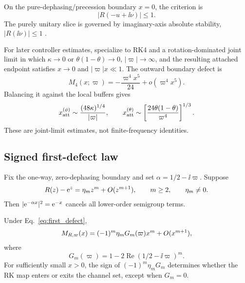 On the pure-dephasing/precession boundary $x=0$, the criterion is
\begin{equation}
 |R(-u+\ii\nu)|\le1.
 \label{eq:pure_dephasing}
\end{equation}
The purely unitary slice is governed by imaginary-axis absolute stability, $|R(\ii\nu)|\le1$ \cite{HairerNorsettWanner1993,IserlesNorsett1991OrderStars}.

For later controller estimates, specialize to RK4 and a rotation-dominated joint limit in which $\kappa\to0$ or $\theta(1-\theta)\to0$, $|\varpi|\to\infty$, and the resulting attached endpoint satisfies $x\to0$ and $|\varpi|x\ll1$. The outward boundary defect is
\begin{equation}
 M_4(x;\varpi)=-\frac{\varpi^4x^5}{24}+o(\varpi^4x^5).
\end{equation}
Balancing it against the local buffers gives
\begin{equation}
 x_{\rm att}^{(\phi)}\sim\frac{(48\kappa)^{1/4}}{|\varpi|},
 \qquad
 x_{\rm att}^{(\theta)}\sim
 \left[\frac{24\theta(1-\theta)}{\varpi^4}\right]^{1/3}.
 \label{eq:attached_scaling}
\end{equation}
These are joint-limit estimates, not finite-frequency identities.

\subsection{Signed first-defect law}

Fix the one-way, zero-dephasing boundary and set $\alpha=1/2-\ii\varpi$. Suppose
\begin{equation}
 R(z)-\mathrm{e}^z=\eta_m z^m+O(z^{m+1}),
 \qquad m\ge2,
 \qquad \eta_m\ne0.
 \label{eq:first_defect}
\end{equation}
Then $|\mathrm{e}^{-\alpha x}|^2=\mathrm{e}^{-x}$ cancels all lower-order semigroup terms.

\begin{theorem}
\label{thm:defect}
Under Eq.~\eqref{eq:first_defect},
\begin{equation}
 M_{R,\varpi}(x)
 =(-1)^m\eta_mG_m(\varpi)x^m+O(x^{m+1}),
 \label{eq:defect_law}
\end{equation}
where
\begin{equation}
 G_m(\varpi)=1-2\operatorname{Re}(1/2-\ii\varpi)^m.
 \label{eq:G_definition}
\end{equation}
For sufficiently small $x>0$, the sign of $(-1)^m\eta_mG_m$ determines whether the RK map enters or exits the channel set, except when $G_m=0$.
\end{theorem}

